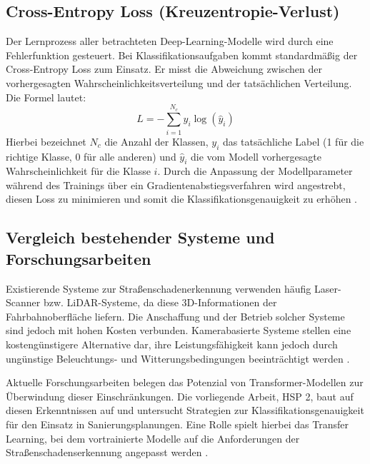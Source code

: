 \subsection{Cross-Entropy Loss (Kreuzentropie-Verlust)}
\label{subsec:cross_entropy}

Der Lernprozess aller betrachteten Deep-Learning-Modelle wird durch eine Fehlerfunktion gesteuert. Bei Klassifikationsaufgaben kommt standardmäßig der Cross-Entropy Loss zum Einsatz. Er misst die Abweichung zwischen der vorhergesagten Wahrscheinlichkeitsverteilung und der tatsächlichen Verteilung. Die Formel lautet:
\begin{equation}
    L = -\sum_{i=1}^{N_c} y_i \log(\hat{y}_i)
\end{equation}
Hierbei bezeichnet $N_c$ die Anzahl der Klassen, $y_i$ das tatsächliche Label (1 für die richtige Klasse, 0 für alle anderen) und $\hat{y}_i$ die vom Modell vorhergesagte Wahrscheinlichkeit für die Klasse $i$. Durch die Anpassung der Modellparameter während des Trainings über ein Gradientenabstiegsverfahren wird angestrebt, diesen Loss zu minimieren und somit die Klassifikationsgenauigkeit zu erhöhen \cite[Kapitel 5.7]{prince2023understanding}.

\subsection{Vergleich bestehender Systeme und Forschungsarbeiten}
\label{subsec:vergleich}

Existierende Systeme zur Straßenschadenerkennung verwenden häufig Laser-Scanner bzw. LiDAR-Systeme, da diese 3D-Informationen der Fahrbahnoberfläche liefern. Die Anschaffung und der Betrieb solcher Systeme sind jedoch mit hohen Kosten verbunden. Kamerabasierte Systeme stellen eine kostengünstigere Alternative dar, ihre Leistungsfähigkeit kann jedoch durch ungünstige Beleuchtungs- und Witterungsbedingungen beeinträchtigt werden \cite{hamaguchi2018development}.

Aktuelle Forschungsarbeiten belegen das Potenzial von Transformer-Modellen zur Überwindung dieser Einschränkungen. Die vorliegende Arbeit, HSP 2, baut auf diesen Erkenntnissen auf und untersucht Strategien zur Klassifikationsgenauigkeit für den Einsatz in Sanierungsplanungen. Eine Rolle spielt hierbei das Transfer Learning, bei dem vortrainierte Modelle auf die Anforderungen der Straßenschadenserkennung angepasst werden \cite[Kapitel 4]{amaratunga2023}.
